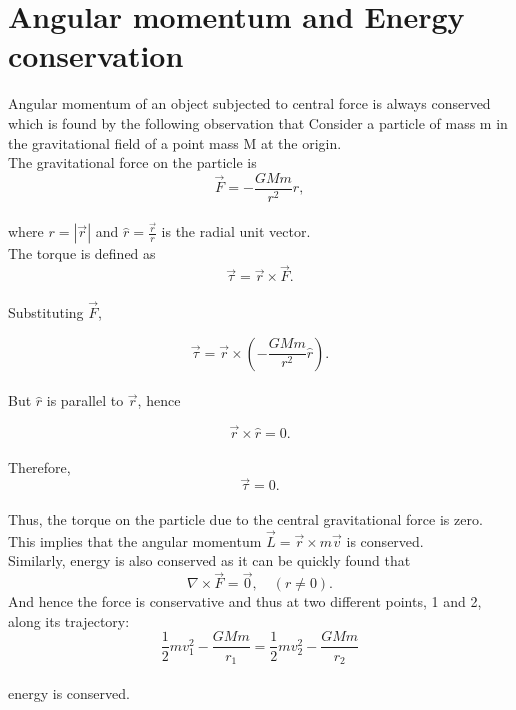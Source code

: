 \documentclass{article}
\begin{document}
\section{ Angular momentum and Energy conservation}
Angular momentum of an object subjected to central force is always conserved which is found by the following observation that Consider a particle of mass m in the gravitational field of a point mass M at the origin.
\\
The gravitational force on the particle is
$$
\vec{F} = -\frac{GMm}{r^2} \hat{r},
$$
\\
where $r = |\vec{r}|$ and $\hat{r} = \frac{\vec{r}}{r}$ is the radial unit vector.  
\\
The torque is defined as  
$$
\vec{\tau} = \vec{r} \times \vec{F}.
$$
\\
Substituting $\vec{F}$,  

$$
\vec{\tau} = \vec{r} \times \left(-\frac{GMm}{r^2} \hat{r}\right).
$$
\\
But $\hat{r}$ is parallel to $\vec{r}$, hence  

$$
\vec{r} \times \hat{r} = 0.
$$
\\
Therefore,  
$$
\vec{\tau} = 0.
$$
\\
Thus, the torque on the particle due to the central gravitational force is zero.  
This implies that the angular momentum $\vec{L} = \vec{r} \times m\vec{v}$ is conserved.  
\\
Similarly, energy is also conserved as it can be quickly found that  
\\
$$
\nabla \times \vec{F} = \vec{0}, \quad (r \neq 0).
$$
And hence the force is conservative and thus at two different points, 1 and 2, along its trajectory:  
\\
$$
\frac{1}{2} m v_1^2 - \frac{GMm}{r_1} 
= \frac{1}{2} m v_2^2 - \frac{GMm}{r_2}
$$
\\
energy is conserved. 
\end{document}
